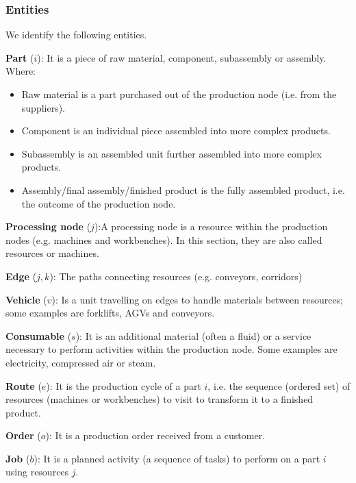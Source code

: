 \subsubsection{Entities}
We identify the following entities.\par
\textbf{Part} ($i$): It is a piece of raw material, component, subassembly or assembly. Where:
\begin{itemize}
    \item Raw material is a part purchased out of the production node (i.e. from the suppliers).
    \item Component is an individual piece assembled into more complex products.
    \item Subassembly is an assembled unit further assembled into more complex products.
    \item Assembly/final assembly/finished product is the fully assembled product, i.e. the outcome of the production node.
\end{itemize}
\par

\textbf{Processing node} ($j$):A processing node is a resource within the production nodes (e.g. machines and workbenches). In this section, they are also called resources or machines. \par

\textbf{Edge} ($j,k$): The paths connecting resources (e.g. conveyors, corridors) \par

\textbf{Vehicle} ($v$): Is a unit travelling on edges to handle materials between resources; some examples are forklifts, AGVs and conveyors. \par

\textbf{Consumable} ($s$): It is an additional material (often a fluid) or a service necessary to perform activities within the production node. Some examples are electricity, compressed air or steam. \par

\textbf{Route} ($e$): It is the production cycle of a part $i$, i.e. the sequence (ordered set) of resources (machines or workbenches) to visit to transform it to a finished product. \par

\textbf{Order} ($o$): It is a production order received from a customer. \par

\textbf{Job} ($b$): It is a planned activity (a sequence of tasks) to perform on a part $i$ using resources $j$. \par

